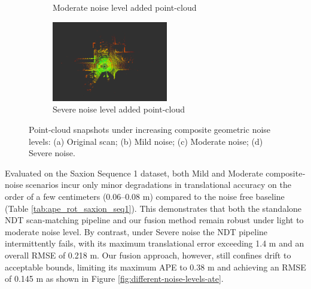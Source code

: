 \begin{figure}[H]
\begin{subfigure}[t]{0.46\textwidth}
		\caption{ Moderate noise level added point-cloud
		}
		\label{fig::mild-noise-level-pointcloud}
	\end{subfigure}
      \hfill
	\begin{subfigure}[t]{0.46\textwidth}
		\includegraphics[height=3.5cm , width=\linewidth]{images/level3_noiseb.png}
		\caption{ Severe noise level added point-cloud
		}
		\label{fig:mild-noise-level-pointcloud}
	\end{subfigure}
		
	\caption{Point‐cloud snapshots under increasing composite geometric noise levels: (a) Original scan; (b) Mild noise; (c) Moderate noise; (d) Severe noise.}
	
	\label{fig:different-noise-levels}
\end{figure}

Evaluated on the Saxion Sequence 1 dataset, both Mild and Moderate composite‐noise scenarios incur only minor degradations in translational accuracy on the order of a few centimeters (0.06–0.08 m) compared to the noise free baseline (Table \ref{tab:ape_rot_saxion_seq1}). This demonstrates that both the standalone NDT scan‐matching pipeline and our fusion method remain robust under light to moderate noise level. By contrast, under Severe noise the NDT pipeline intermittently fails, with its maximum translational error exceeding 1.4 m and an overall RMSE of 0.218 m. Our fusion approach, however, still confines drift to acceptable bounds, limiting its maximum APE to 0.38 m and achieving an RMSE of 0.145 m as shown in Figure \ref{fig:different-noise-levels-ate}.

